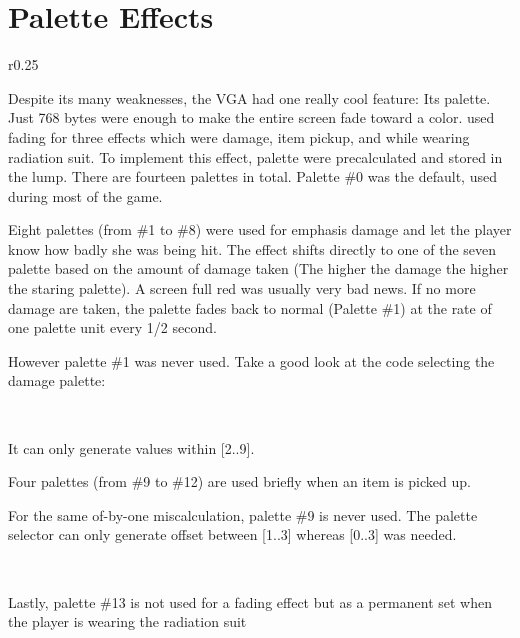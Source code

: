 \section{Palette Effects}
\begin{wrapfigure}[8]{r}{0.25\textwidth}
\centering
{}
\end{wrapfigure}

Despite its many weaknesses, the VGA had one really cool feature: Its palette. Just 768 bytes were enough to make the entire screen fade toward a color. \doom used fading for three effects which were damage, item pickup, and while wearing radiation suit. To implement this effect, palette were precalculated and stored in the  lump. There are fourteen palettes in total. Palette \#0 was the default, used during most of the game.\\
\par
Eight palettes (from \#1 to \#8) were used for emphasis damage and let the player know how badly she was being hit. The effect shifts directly to one of the seven palette based on the amount of damage taken (The higher the damage the higher the staring palette). A screen full red was usually very bad news. If no more damage are taken, the palette fades back to normal (Palette \#1) at the rate of one palette unit every 1/2 second.\\
\par
{}
\par
However palette \#1 was never used. Take a good look at the code selecting the damage palette:\\
\par
{}\\
\par
It can only generate values within [2..9].\\
\par
Four palettes (from \#9 to \#12) are used briefly when an item is picked up.\\
\par
{}
\par
For the same of-by-one miscalculation, palette \#9 is never used. The palette selector can only generate offset between [1..3] whereas [0..3] was needed.\\
\par
{}\\
\par
Lastly, palette \#13 is not used for a fading effect but as a permanent set when the player is wearing the radiation suit \\ \par

